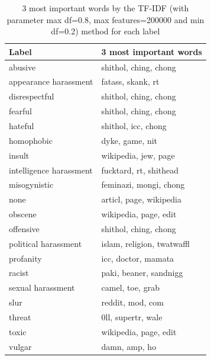 \documentclass[fleqn,moreauthors,10pt]{ds_report}
\begin{document}
\begin{table}[h]
    \centering
    \begin{tabular}{ll}
        \toprule
                      Label &         3 most important words \\
        \midrule
                        abusive &      shithol, ching, chong \\
          appearance harassment &          fatass, skank, rt \\
                  disrespectful &      shithol, ching, chong \\
                        fearful &      shithol, ching, chong \\
                        hateful &        shithol, icc, chong \\
                     homophobic &            dyke, game, nit \\
                         insult &       wikipedia, jew, page \\
        intelligence harassment &     fucktard, rt, shithead \\
                   misogynistic &     feminazi, mongi, chong \\
                           none &    articl, page, wikipedia \\
                        obscene &      wikipedia, page, edit \\
                      offensive &      shithol, ching, chong \\
           political harassment & islam, religion, twatwaffl \\
                      profanity &        icc, doctor, mamata \\
                         racist &     paki, beaner, sandnigg \\
              sexual harassment &           camel, toe, grab \\
                           slur &           reddit, mod, com \\
                         threat &         0ll, supertr, wale \\
                          toxic &      wikipedia, page, edit \\
                         vulgar &              damn, amp, ho \\
        \bottomrule
        \end{tabular}
    \label{tab:tf_idf}
    \caption{3 most important words by the TF-IDF (with parameter max df=0.8, max features=200000 and min df=0.2) method for each label}
\end{table}
\end{document}
